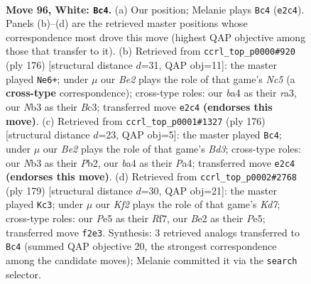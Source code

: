 \documentclass[11pt]{article}
\begin{document}
\clearpage

\begin{figure}[p]\centering
\begin{subfigure}{0.46\textwidth}\centering
\resizebox{\linewidth}{!}{%
\newchessgame
\chessboard[
  setfen={3r4/4kp2/6p1/4P3/bn3Ppp/1N6/4BK1P/8 w - - 6 96},
  showmover=false,
  pgfstyle=straightmove, color=movearrow, markmove={e2-c4}
]}
\caption{}
\end{subfigure}\hfill
\begin{subfigure}{0.46\textwidth}\centering
\resizebox{\linewidth}{!}{%
\newchessgame
\chessboard[
  setfen={8/6k1/2Bn1pp1/2N4p/7P/r1BK2P1/8/8 w - - 44 89},
  showmover=false,
  pgfstyle=straightmove, color=movearrow, markmove={c5-e6}
]}
\caption{}
\end{subfigure}
\\[4pt]
\begin{subfigure}{0.46\textwidth}\centering
\resizebox{\linewidth}{!}{%
\newchessgame
\chessboard[
  setfen={8/p1b2p2/5k1p/2p2p2/P4P2/2PBK2P/1P6/8 w - - 83 89},
  showmover=false,
  pgfstyle=straightmove, color=movearrow, markmove={d3-c4}
]}
\caption{}
\end{subfigure}\hfill
\begin{subfigure}{0.46\textwidth}\centering
\resizebox{\linewidth}{!}{%
\newchessgame
\chessboard[
  setfen={8/5r2/3p4/3Pp2p/4P2P/6K1/1Rbk2B1/8 b - - 78 90},
  showmover=false,
  pgfstyle=straightmove, color=movearrow, markmove={d2-c3}
]}
\caption{}
\end{subfigure}
\caption{\textbf{Move 96, White: \texttt{Bc4}.} (a) Our position; Melanie plays \texttt{Bc4} (\texttt{e2c4}). Panels (b)--(d) are the retrieved master positions whose correspondence most drove this move (highest QAP objective among those that transfer to it). (b) Retrieved from \texttt{ccrl\_top\_p0000\#920} (ply 176) [structural distance $d$=31, QAP obj=11]: the master played \texttt{Ne6+}; under $\mu$ our \emph{Be2} plays the role of that game's \emph{Nc5} (a \textbf{cross-type} correspondence); cross-type roles: our \emph{b}a4 as their \emph{r}a3, our \emph{N}b3 as their \emph{B}c3; transferred move \texttt{e2c4} \textbf{(endorses this move)}. (c) Retrieved from \texttt{ccrl\_top\_p0001\#1327} (ply 176) [structural distance $d$=23, QAP obj=5]: the master played \texttt{Bc4}; under $\mu$ our \emph{Be2} plays the role of that game's \emph{Bd3}; cross-type roles: our \emph{N}b3 as their \emph{P}b2, our \emph{b}a4 as their \emph{P}a4; transferred move \texttt{e2c4} \textbf{(endorses this move)}. (d) Retrieved from \texttt{ccrl\_top\_p0002\#2768} (ply 179) [structural distance $d$=30, QAP obj=21]: the master played \texttt{Kc3}; under $\mu$ our \emph{Kf2} plays the role of that game's \emph{Kd7}; cross-type roles: our \emph{P}e5 as their \emph{R}f7, our \emph{B}e2 as their \emph{P}e5; transferred move \texttt{f2e3}. Synthesis: 3 retrieved analogs transferred to \texttt{Bc4} (summed QAP objective 20, the strongest correspondence among the candidate moves); Melanie committed it via the \texttt{search} selector.}
\label{fig:thought-m190}
\end{figure}
\end{document}
